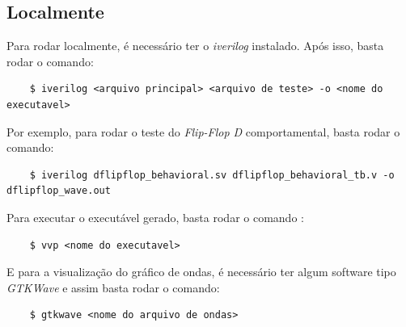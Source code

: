 \documentclass{article}
\begin{document}
\subsection{Localmente}

Para rodar localmente, é necessário ter o \emph{iverilog} instalado. Após isso, basta rodar o comando: 

\begin{verbatim}
    $ iverilog <arquivo principal> <arquivo de teste> -o <nome do executavel>
\end{verbatim}
Por exemplo, para rodar o teste do \emph{Flip-Flop D} comportamental, basta rodar o comando:

\begin{verbatim}
    $ iverilog dflipflop_behavioral.sv dflipflop_behavioral_tb.v -o dflipflop_wave.out 
\end{verbatim}
    

Para executar o executável gerado, basta rodar o comando :
\begin{verbatim}
    $ vvp <nome do executavel>
\end{verbatim}

E para a visualização do gráfico de ondas, é necessário ter algum software tipo \emph{GTKWave} e assim basta rodar o comando:
\begin{verbatim}
    $ gtkwave <nome do arquivo de ondas>
\end{verbatim}
\end{document}
